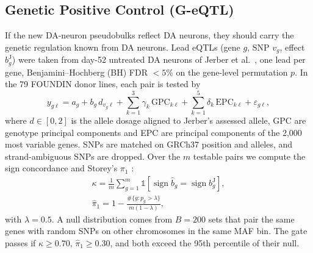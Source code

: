 \subsection{Genetic Positive Control (G-eQTL)}\label{sec:geqtl}
If the new DA-neuron pseudobulks reflect DA neurons, they should carry the genetic regulation
known from DA neurons. Lead eQTLs (gene $g$, SNP $v_g$, effect $b^{\mathrm{J}}_g$) were taken from
day-52 untreated DA neurons of Jerber et al.\ \cite{jerber2021population}, one lead per gene,
Benjamini--Hochberg (BH) FDR $< 5\%$ on the gene-level permutation $p$. In the 79 FOUNDIN donor
lines, each pair is tested by
\begin{equation}
y_{g\ell} = a_g + b_g\, d_{v_g\ell} + \sum_{k=1}^{3}\gamma_k\,\mathrm{GPC}_{k\ell}
+ \sum_{k=1}^{5}\delta_k\,\mathrm{EPC}_{k\ell} + \varepsilon_{g\ell},
\label{eq:eqtl}
\end{equation}
where $d \in [0,2]$ is the allele dosage aligned to Jerber's assessed allele, GPC are genotype
principal components and EPC are principal components of the 2,000 most variable genes. SNPs are
matched on GRCh37 position and alleles, and strand-ambiguous SNPs are dropped. Over the $m$ testable
pairs we compute the sign concordance and Storey's $\pi_1$ \cite{storey2003qvalue}:
\begin{gather}
\kappa = \frac{1}{m}\sum_{g=1}^{m}\mathbb{1}\!\left[\operatorname{sign}\hat{b}_g = \operatorname{sign} b^{\mathrm{J}}_g\right],
\label{eq:kappa}\\
\hat{\pi}_1 = 1 - \frac{\#\{g : p_g > \lambda\}}{m(1-\lambda)},
\label{eq:pi1}
\end{gather}
with $\lambda = 0.5$. A null distribution comes from $B = 200$ sets that pair the same genes with
random SNPs on other chromosomes in the same MAF bin. The gate passes if
$\kappa \ge 0.70$, $\hat\pi_1 \ge 0.30$, and both exceed the 95th percentile of their null.

